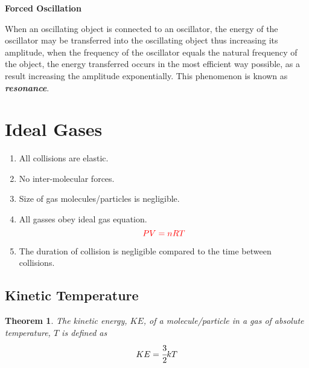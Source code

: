 \documentclass{article}
\newtheorem{theorem}{Theorem}[subsection]
\begin{document}
\begin{flushleft}
     \textbf{Forced Oscillation}
\end{flushleft}

When an oscillating object is connected to an oscillator, the energy of the oscillator may be transferred into the oscillating object thus increasing its amplitude, when the frequency of the oscillator equals the natural frequency of the object, the energy transferred occurs in the most efficient way possible, as a result increasing the amplitude exponentially. This phenomenon is known as \textbf{\textit{resonance}}.

\newpage
\section{Ideal Gases}

\begin{tcolorbox}[colframe=black!20!white,title=
 \color{red}{Assumptions}]

\begin{enumerate}
\color{red}
    \item All collisions are elastic.
    \item No inter-molecular forces.
    \item Size of gas molecules/particles is negligible.
     \item All gasses obey ideal gas equation.
     $$\color{red}{PV=nRT}$$
     \item The duration of collision is negligible compared to the time between collisions.
\end{enumerate}
\end{tcolorbox}


 \subsection{Kinetic Temperature}

\begin{theorem}
The kinetic energy, $KE$, of a molecule/particle in a gas of absolute temperature, $T$ is defined as 
$$KE=\cfrac{3}{2}kT$$
\end{theorem}
\end{document}
